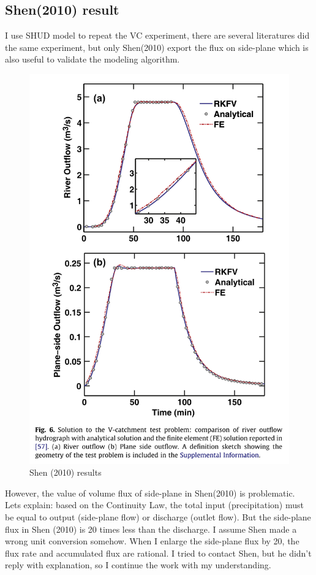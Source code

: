 \documentclass[
]{scrbook}
\begin{document}
\hypertarget{shen2010-result}{%
\subsection{Shen(2010) result}\label{shen2010-result}}

I use SHUD model to repeat the VC experiment, there are several literatures did the same experiment, but only Shen(2010) export the flux on side-plane which is also useful to validate the modeling algorithm.

\begin{figure}
\centering
\includegraphics{Fig/Example/vCat/Shen2010.png}
\caption{Shen (2010) results}
\end{figure}

However, the value of volume flux of side-plane in Shen(2010) is problematic. Lets explain: based on the Continuity Law, the total input (precipitation) must be equal to output (side-plane flow) or discharge (outlet flow). But the side-plane flux in Shen (2010) is 20 times less than the discharge. I assume Shen made a wrong unit conversion somehow. When I enlarge the side-plane flux by 20, the flux rate and accumulated flux are rational. I tried to contact Shen, but he didn't reply with explanation, so I continue the work with my understanding.
\end{document}
